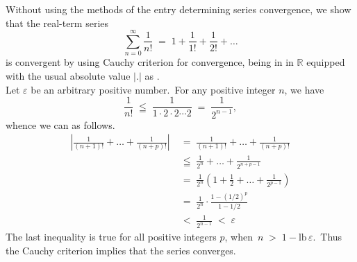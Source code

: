 \documentclass[12pt]{article}
\theoremstyle{definition}
\begin{document}
Without using the methods of the entry determining series convergence, we show that the real-term series
$$\sum_{n=0}^\infty\frac{1}{n!} \;=\; 1+\frac{1}{1!}+\frac{1}{2!}+\ldots$$
is convergent by using Cauchy criterion for convergence, being in  in $\mathbb{R}$ equipped with the usual absolute value $|.|$ as .\\

Let $\varepsilon$ be an arbitrary positive number.\, For any positive integer $n$, we have
$$\frac{1}{n!} \;\leqq\; \frac{1}{1\cdot2\cdot2\cdots2} \;=\; \frac{1}{2^{n-1}},$$
whence we can  as follows.
\begin{align*}
\left|\frac{1}{(n\!+\!1)!}+\ldots+\frac{1}{(n\!+\!p)!}\right| &\;=\; \frac{1}{(n\!+\!1)!}+\ldots+\frac{1}{(n\!+\!p)!}\\
&\;\leqq\; \frac{1}{2^n}+\ldots+\frac{1}{2^{n+p-1}}\\
&\;=\; \frac{1}{2^n}\left(1+\frac{1}{2}+\ldots+\frac{1}{2^{p-1}}\right)\\
&\;=\; \frac{1}{2^n}\cdot\frac{1-(1/2)^p}{1-1/2}\\
&\;<\; \frac{1}{2^{n-1}} \;<\; \varepsilon
\end{align*}
The last inequality is true for all positive integers $p$, when\, $n \;>\; 1-\mbox{lb}\,{\varepsilon}$.\, Thus the Cauchy criterion implies that the series converges.
\end{document}
